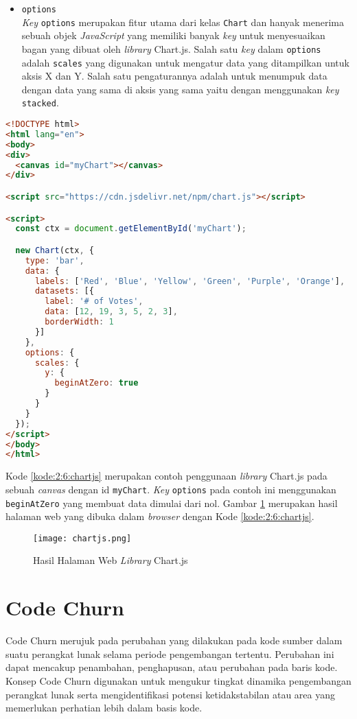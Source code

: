 \begin{itemize}
	\item \verb|options| \\
	\textit{Key} \verb|options| merupakan fitur utama dari kelas \verb|Chart| dan hanyak menerima sebuah objek \textit{JavaScript} yang memiliki banyak \textit{key} untuk menyesuaikan bagan yang dibuat oleh \textit{library} Chart.js. Salah satu \textit{key} dalam \verb|options| adalah \verb|scales| yang digunakan untuk mengatur data yang ditampilkan untuk aksis X dan Y. Salah satu pengaturannya adalah untuk menumpuk data dengan data yang sama di aksis yang sama yaitu dengan menggunakan \textit{key} \verb|stacked|.
\end{itemize}

\begin{lstlisting}[language={html}, caption={Contoh kode penggunaan Chart.js}, label={kode:2:6:chartjs}]
<!DOCTYPE html>
<html lang="en">
<body>
<div>
  <canvas id="myChart"></canvas>
</div>

<script src="https://cdn.jsdelivr.net/npm/chart.js"></script>

<script>
  const ctx = document.getElementById('myChart');

  new Chart(ctx, {
    type: 'bar',
    data: {
      labels: ['Red', 'Blue', 'Yellow', 'Green', 'Purple', 'Orange'],
      datasets: [{
        label: '# of Votes',
        data: [12, 19, 3, 5, 2, 3],
        borderWidth: 1
      }]
    },
    options: {
      scales: {
        y: {
          beginAtZero: true
        }
      }
    }
  });
</script>
</body>
</html>
\end{lstlisting}

Kode \ref{kode:2:6:chartjs} merupakan contoh penggunaan \textit{library} Chart.js pada sebuah \textit{canvas} dengan id \verb|myChart|. \textit{Key} \verb|options| pada contoh ini menggunakan \verb|beginAtZero| yang membuat data dimulai dari nol. Gambar \ref{fig:2:6:chartjs} merupakan hasil halaman web yang dibuka dalam \textit{browser} dengan Kode \ref{kode:2:6:chartjs}.

\begin{figure}[H]
	\centering
	\texttt{[image: chartjs.png]}
	\caption{Hasil Halaman Web \textit{Library} Chart.js}
	\label{fig:2:6:chartjs}
\end{figure}

\section{Code Churn}

Code Churn merujuk pada perubahan yang dilakukan pada kode sumber dalam suatu perangkat lunak selama periode pengembangan tertentu. Perubahan ini dapat mencakup penambahan, penghapusan, atau perubahan pada baris kode. Konsep Code Churn digunakan untuk mengukur tingkat dinamika pengembangan perangkat lunak serta mengidentifikasi potensi ketidakstabilan atau area yang memerlukan perhatian lebih dalam basis kode.

